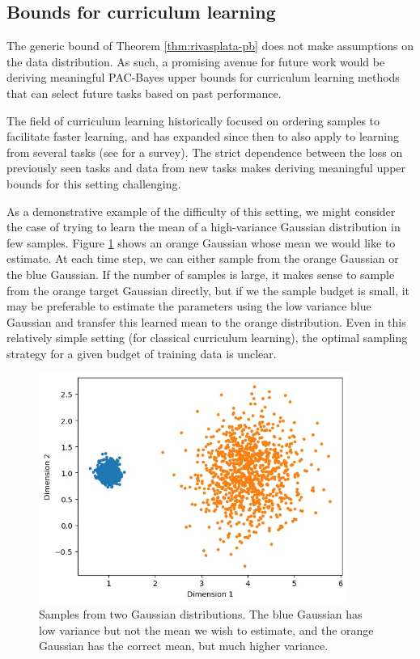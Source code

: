 \documentclass{article}
\theoremstyle{definition}
\begin{document}
\subsection{Bounds for curriculum learning} 

The generic bound of Theorem \ref{thm:rivasplata-pb} does not make assumptions on the data distribution. As such, a promising avenue for future work would be deriving meaningful PAC-Bayes upper bounds for curriculum learning methods that can select future tasks based on past performance. 

The field of curriculum learning \citep{Bengio2009} historically focused on ordering samples to facilitate faster learning, and has expanded since then to also apply to learning from several tasks (see \citet{Soviany2021} for a survey). The strict dependence between the loss on previously seen tasks and data from new tasks makes deriving meaningful upper bounds for this setting challenging. 

As a demonstrative example of the difficulty of this setting, we might consider the case of trying to learn the mean of a high-variance Gaussian distribution in few samples. Figure \ref{fig:cl_demo} shows an orange Gaussian whose mean we would like to estimate. At each time step, we can either sample from the orange Gaussian or the blue Gaussian. If the number of samples is large, it makes sense to sample from the orange target Gaussian directly, but if we the sample budget is small, it may be preferable to estimate the parameters using the low variance blue Gaussian and transfer this learned mean to the orange distribution. Even in this relatively simple setting (for classical curriculum learning), the optimal sampling strategy for a given budget of training data is unclear.

\begin{figure}
	\centering
	\includegraphics[width=0.9\textwidth]{cl_example.JPG}
	\caption{Samples from two Gaussian distributions. The blue Gaussian has low variance but not the mean we wish to estimate, and the orange Gaussian has the correct mean, but much higher variance.}
	\label{fig:cl_demo}
\end{figure}
\end{document}
